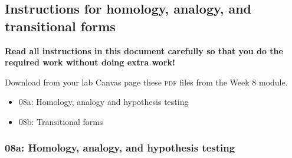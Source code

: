 \documentclass[12pt]{exam}
\begin{document}
\subsection*{Instructions for homology, analogy, and transitional forms}


\textbf{Read all instructions in this document carefully so that you do the required work without doing extra work!}

Download from your lab Canvas page these \textsc{pdf} files from the Week 8 module.

\begin{itemize}
\item 08a: Homology, analogy and hypothesis testing
\item 08b: Transitional forms
\end{itemize}

\subsubsection*{08a: Homology, analogy, and hypothesis testing}
\end{document}
